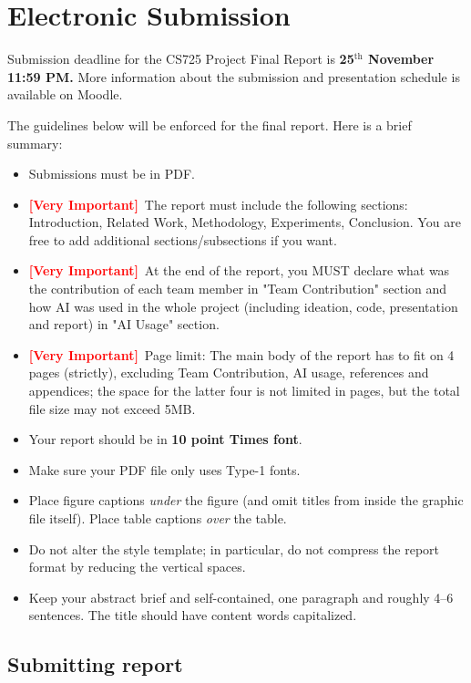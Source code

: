 \documentclass{article}
\theoremstyle{plain}
\theoremstyle{definition}
\theoremstyle{remark}
\begin{document}
\section{Electronic Submission}

Submission deadline for the CS725 Project Final Report is \textbf{25$^{\text{th}}$ November 11:59 PM.}  More information about the submission and presentation schedule is available on Moodle.

The guidelines below will be enforced for the final report. Here is a brief summary:
\begin{itemize}
  \item Submissions must be in PDF\@.
  \item \textbf{\textcolor{red}{[Very Important]}}~The report must include the following sections: Introduction, Related Work, Methodology, Experiments, Conclusion. You are free to add additional sections/subsections if you want. 
  \item \textbf{\textcolor{red}{[Very Important]}}~At the end of the report, you MUST declare what was the contribution of each team member in "Team Contribution" section and how AI was used in the whole project (including ideation, code, presentation and report) in "AI Usage" section. 
  \item \textbf{\textcolor{red}{[Very Important]}}~Page limit: The main body of the report has to fit on 4 pages (strictly),
        excluding Team Contribution, AI usage, references and appendices; the space for the latter four is not
        limited in pages, but the total file size may not exceed 5MB. 
  \item Your report should be in \textbf{10 point Times font}.
  \item Make sure your PDF file only uses Type-1 fonts.
  \item Place figure captions \emph{under} the figure (and omit titles from
        inside the graphic file itself). Place table captions \emph{over} the
        table.
  \item Do not alter the style template; in particular, do not compress the
        report format by reducing the vertical spaces.
  \item Keep your abstract brief and self-contained, one paragraph and roughly
        4--6 sentences. The title should have content words capitalized.
\end{itemize}

\subsection{Submitting report}
\end{document}
